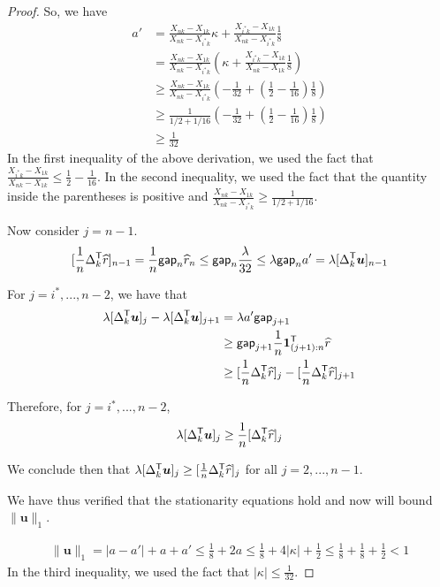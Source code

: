 \documentclass[12pt,pdftex,aos,noinfoline,addressasfootnote]{imsart}
\begin{document}
\begin{proof}
So, we have 
\begin{align*}
a' &= \frac{X_{nk} - X_{1k}}{X_{nk} - X_{i^*k}} \kappa 
   + \frac{ X_{i^*k} - X_{1k}}{X_{nk} - X_{i^*k}} \frac{1}{8} \\
 &= \frac{X_{nk} - X_{1k}}{X_{nk} - X_{i^*k}} \left(
  \kappa + \frac{X_{i^*k} - X_{1k}}{X_{nk} - X_{1k}} \frac{1}{8} \right) \\
&\geq \frac{X_{nk} - X_{1k}}{X_{nk} - X_{i^*k}} \left(
  -\frac{1}{32} + (\frac{1}{2} - \frac{1}{16}) \frac{1}{8} \right) \\
&\geq \frac{1}{1/2 + 1/16} \left(
  -\frac{1}{32} + (\frac{1}{2} - \frac{1}{16}) \frac{1}{8} \right) \\
&\geq \frac{1}{32}
\end{align*}
In the first inequality of the above derivation, we used the fact that $\frac{X_{i^*k} - X_{1k}}{X_{nk} - X_{1k}} \leq \frac{1}{2} - \frac{1}{16}$. In the second inequality, we used the fact that the quantity inside the parentheses is positive and $\frac{X_{nk} - X_{1k}}{X_{nk} - X_{i^*k}} \geq \frac{1}{1/2 + 1/16}$.

Now consider $j=n-1$. 
\[
[ \frac{1}{n} \Delta_k^{\mathsf{T}} \widehat{r} ]_{n-1} = \frac{1}{n} \mathsf{gap}_n \widehat{r}_n 
 \leq \mathsf{gap}_n \frac{\lambda }{32} \leq \lambda \mathsf{gap}_n a' = \lambda [\Delta_k^{\mathsf{T}} \mbox{\boldmath $u$}]_{n-1} 
\]

For $j = i^*, ..., n-2$, we have that 
\begin{align*}
\lambda [\Delta_k^{\mathsf{T}} \mbox{\boldmath $u$} ]_j - \lambda [\Delta_k^{\mathsf{T}} \mbox{\boldmath $u$}]_{j+1} &= 
 \lambda a' \mathsf{gap}_{j+1}  \\
 &\geq \mathsf{gap}_{j+1} \frac{1}{n} \mbox{\boldmath $1$}_{(j+1):n}^{\mathsf{T}} \widehat{r}  \\
 &\geq  [\frac{1}{n} \Delta_k^{\mathsf{T}} \widehat{r}]_j - [\frac{1}{n} \Delta_k^{\mathsf{T}} \widehat{r}]_{j+1}
\end{align*}

Therefore, for $j = i^*,...,n-2$,
\begin{align*}
\lambda [\Delta_k^{\mathsf{T}} \mbox{\boldmath $u$}]_j \geq \frac{1}{n} [ \Delta_k^{\mathsf{T}} \widehat{r}]_j
\end{align*}

We conclude then that $\lambda [\Delta_k^{\mathsf{T}} \mbox{\boldmath $u$} ]_j \geq [\frac{1}{n} \Delta_k^{\mathsf{T}} \widehat{r}]_j$ for all $j = 2,...,n-1$. 

We have thus verified that the stationarity equations hold and now will bound $\| \mathbf{u} \|_1$.

\begin{align*}
\| \mathbf{u} \|_1 = | a - a'| + a + a' \leq \frac{1}{8} + 2 a \leq \frac{1}{8} + 4 |\kappa| + \frac{1}{2}  \leq \frac{1}{8} + \frac{1}{8} + \frac{1}{2} < 1
\end{align*}
In the third inequality, we used the fact that $|\kappa| \leq \frac{1}{32}$.


\end{proof}
\end{document}
